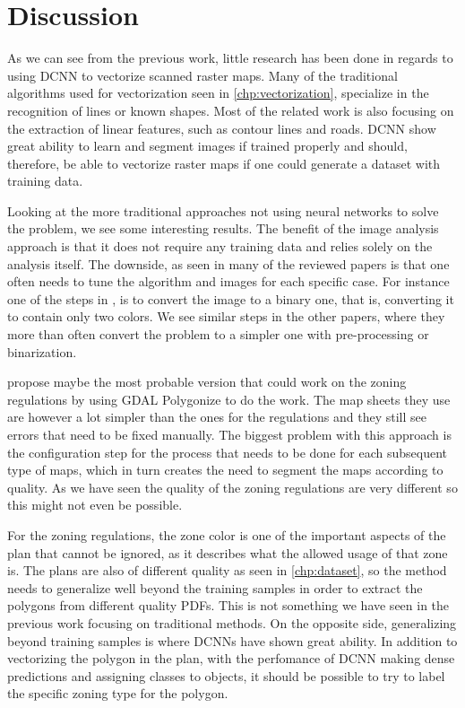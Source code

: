 \chapter{Discussion}
As we can see from the previous work, little research has been done in regards to using DCNN to vectorize scanned raster maps. Many of the traditional algorithms used for vectorization seen in \autoref{chp:vectorization}, specialize in the recognition of lines or known shapes. Most of the related work is also focusing on the extraction of linear features, such as contour lines and roads. DCNN show great ability to learn and segment images if trained properly and should, therefore, be able to vectorize raster maps if one could generate a dataset with training data.

Looking at the more traditional approaches not using neural networks to solve the problem, we see some interesting results. The benefit of the image analysis approach is that it does not require any training data and relies solely on the analysis itself. The downside, as seen in many of the reviewed papers is that one often needs to tune the algorithm and images for each specific case. For instance one of the steps in \citet{Iosifescu2016}, is to convert the image to a binary one, that is, converting it to contain only two colors. We see similar steps in the other papers, where they more than often convert the problem to a simpler one with pre-processing or binarization. 

\citet{GiraldoArteaga2013} propose maybe the most probable version that could work on the zoning regulations by using GDAL Polygonize to do the work. The map sheets they use are however a lot simpler than the ones for the regulations and they still see errors that need to be fixed manually. The biggest problem with this approach is the configuration step for the process that needs to be done for each subsequent type of maps, which in turn creates the need to segment the maps according to quality. As we have seen the quality of the zoning regulations are very different so this might not even be possible.

For the zoning regulations, the zone color is one of the important aspects of the plan that cannot be ignored, as it describes what the allowed usage of that zone is. The plans are also of different quality as seen in \autoref{chp:dataset}, so the method needs to generalize well beyond the training samples in order to extract the polygons from different quality PDFs. This is not something we have seen in the previous work focusing on traditional methods. On the opposite side, generalizing beyond training samples is where DCNNs have shown great ability. In addition to vectorizing the polygon in the plan, with the perfomance of DCNN making dense predictions and assigning classes to objects, it should be possible to try to label the specific zoning type for the polygon.


